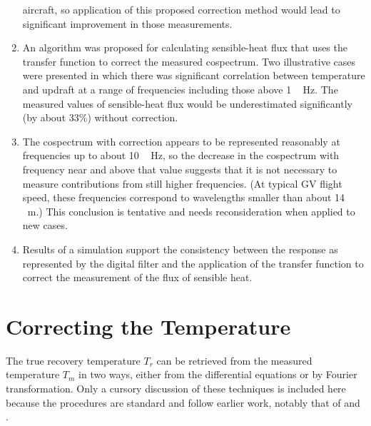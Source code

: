 \documentclass[amt, manuscript]{copernicus}
\begin{document}
\begin{enumerate}
aircraft, so application of this proposed correction method would lead
to significant improvement in those measurements.
\item An algorithm was proposed for calculating sensible-heat flux that uses the transfer
function to correct the measured cospectrum.
Two illustrative cases were presented in which there was significant
correlation between temperature and updraft at a range of frequencies
including those above \unit{1\,Hz}. The measured values of sensible-heat
flux would be underestimated significantly (by about 33\%) without
correction.
\item The cospectrum with correction appears to be represented reasonably
at frequencies up to about \unit{10\,Hz}, so the decrease in the cospectrum
with frequency near and above that value suggests that it is not necessary to
measure contributions from still higher frequencies. (At typical GV flight
speed, these frequencies correspond to
wavelengths smaller than about \unit{14\,m}.)  This conclusion
is tentative and needs reconsideration when applied to new cases.
\item Results of a simulation support the consistency between the response
as represented by the digital filter and the application of the transfer
function to correct the measurement of the flux of sensible heat.
\end{enumerate}
\newpage
\appendix

\section{\texorpdfstring{Correcting the Temperature
\label{sec:Correcting-the-Temperature}}{Correcting the Temperature }}

The true recovery temperature \(T_{r}\) can be retrieved from the
measured temperature \(T_{m}\) in two ways, either from the differential
equations or by Fourier transformation. Only a cursory discussion of
these techniques is included here because the procedures are standard
and follow earlier work, notably that of \citet{InverarityJTech2000} and
\citet{Foster2012Improving}.
\end{document}

